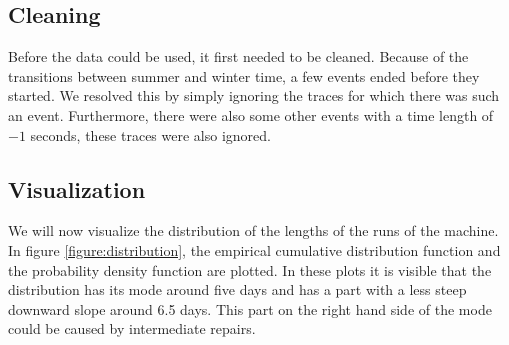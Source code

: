 \documentclass[a4paper]{thesis}
\theoremstyle{definition}
\begin{document}
\subsection{Cleaning}
Before the data could be used, it first needed to be cleaned.
Because of the transitions between summer and winter time, a few events ended before they started.
We resolved this by simply ignoring the traces for which there was such an event.
Furthermore, there were also some other events with a time length of $-1$ seconds, these traces were also ignored.

\subsection{Visualization}
We will now visualize the distribution of the lengths of the runs of the machine.
In figure \ref{figure:distribution}, the empirical cumulative distribution function and the probability density function are plotted.
In these plots it is visible that the distribution has its mode around five days and has a part with a less steep downward slope around 6.5 days.
This part on the right hand side of the mode could be caused by intermediate repairs.
\end{document}
